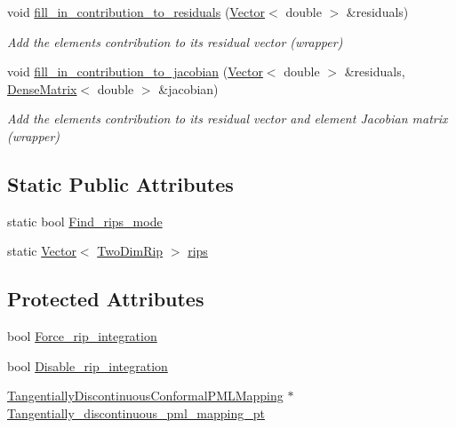 \begin{DoxyCompactItemize}
\item 
void \hyperlink{classoomph_1_1TangentiallyDiscontinuousConformal2DPMLElement_a9f5ccd0826199bd3161c5d67c14344b3}{fill\+\_\+in\+\_\+contribution\+\_\+to\+\_\+residuals} (\hyperlink{classoomph_1_1Vector}{Vector}$<$ double $>$ \&residuals)
\begin{DoxyCompactList}\small\item\em Add the element\textquotesingle{}s contribution to its residual vector (wrapper) \end{DoxyCompactList}\item 
void \hyperlink{classoomph_1_1TangentiallyDiscontinuousConformal2DPMLElement_a0ed7e453ed779544372498057d197e6a}{fill\+\_\+in\+\_\+contribution\+\_\+to\+\_\+jacobian} (\hyperlink{classoomph_1_1Vector}{Vector}$<$ double $>$ \&residuals, \hyperlink{classoomph_1_1DenseMatrix}{Dense\+Matrix}$<$ double $>$ \&jacobian)
\begin{DoxyCompactList}\small\item\em Add the element\textquotesingle{}s contribution to its residual vector and element Jacobian matrix (wrapper) \end{DoxyCompactList}\end{DoxyCompactItemize}
\subsection*{Static Public Attributes}
\begin{DoxyCompactItemize}
\item 
static bool \hyperlink{classoomph_1_1TangentiallyDiscontinuousConformal2DPMLElement_a3a613124c2aa4fded1f74658dcc523c9}{Find\+\_\+rips\+\_\+mode}
\item 
static \hyperlink{classoomph_1_1Vector}{Vector}$<$ \hyperlink{structoomph_1_1TangentiallyDiscontinuousConformal2DPMLElement_1_1TwoDimRip}{Two\+Dim\+Rip} $>$ \hyperlink{classoomph_1_1TangentiallyDiscontinuousConformal2DPMLElement_a07ddc8f71f75a3418fb36917f61d604f}{rips}
\end{DoxyCompactItemize}
\subsection*{Protected Attributes}
\begin{DoxyCompactItemize}
\item 
bool \hyperlink{classoomph_1_1TangentiallyDiscontinuousConformal2DPMLElement_a41eb2a90f1cb709fcdfb9a9ab3e3a101}{Force\+\_\+rip\+\_\+integration}
\item 
bool \hyperlink{classoomph_1_1TangentiallyDiscontinuousConformal2DPMLElement_a9dea74889c96ed8eb7c494e93afc6093}{Disable\+\_\+rip\+\_\+integration}
\item 
\hyperlink{classoomph_1_1TangentiallyDiscontinuousConformalPMLMapping}{Tangentially\+Discontinuous\+Conformal\+P\+M\+L\+Mapping} $\ast$ \hyperlink{classoomph_1_1TangentiallyDiscontinuousConformal2DPMLElement_a1f0b38329426028a291d84464e24ef44}{Tangentially\+\_\+discontinuous\+\_\+pml\+\_\+mapping\+\_\+pt}
\end{DoxyCompactItemize}
